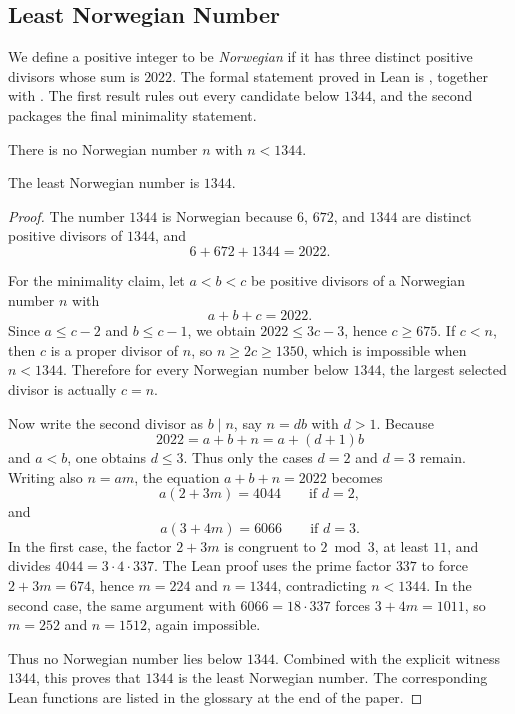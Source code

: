 
\subsection{Least Norwegian Number}

We define a positive integer to be \emph{Norwegian} if it has three distinct
positive divisors whose sum is $2022$. The formal statement proved in Lean is
, together with
. The first result rules
out every candidate below \(1344\), and the second packages the final minimality
statement.

\begin{theorem}
There is no Norwegian number \(n\) with \(n<1344\).
\end{theorem}

\begin{theorem}
The least Norwegian number is \(1344\).
\end{theorem}

\begin{proof}
The number \(1344\) is Norwegian because \(6\), \(672\), and \(1344\) are
distinct positive divisors of \(1344\), and
\[
  6+672+1344 = 2022.
\]

For the minimality claim, let \(a<b<c\) be positive divisors of a Norwegian
number \(n\) with
\[
  a+b+c = 2022.
\]
Since \(a\le c-2\) and \(b\le c-1\), we obtain \(2022 \le 3c-3\), hence
\(c\ge 675\). If \(c<n\), then \(c\) is a proper divisor of \(n\), so
\(n\ge 2c \ge 1350\), which is impossible when \(n<1344\). Therefore for every
Norwegian number below \(1344\), the largest selected divisor is actually
\(c=n\).

Now write the second divisor as \(b \mid n\), say \(n = db\) with \(d>1\).
Because
\[
  2022 = a+b+n = a + (d+1)b
\]
and \(a<b\), one obtains \(d \le 3\). Thus only the cases \(d=2\) and \(d=3\)
remain. Writing also \(n = am\), the equation \(a+b+n=2022\) becomes
\[
  a(2+3m)=4044 \qquad \text{if } d=2,
\]
and
\[
  a(3+4m)=6066 \qquad \text{if } d=3.
\]
In the first case, the factor \(2+3m\) is congruent to \(2 \bmod 3\), at least
\(11\), and divides \(4044 = 3 \cdot 4 \cdot 337\). The Lean proof uses the
prime factor \(337\) to force \(2+3m = 674\), hence \(m=224\) and \(n=1344\),
contradicting \(n<1344\). In the second case, the same argument with
\(6066 = 18 \cdot 337\) forces \(3+4m=1011\), so \(m=252\) and \(n=1512\),
again impossible.

Thus no Norwegian number lies below \(1344\). Combined with the explicit
witness \(1344\), this proves that \(1344\) is the least Norwegian number. The
corresponding Lean functions are listed in the glossary at the end of the
paper.
\end{proof}
